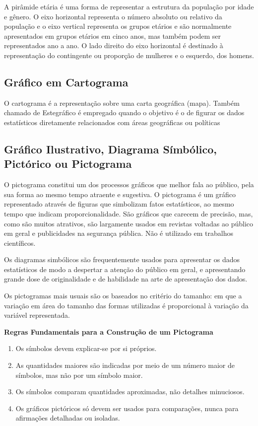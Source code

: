 A pirâmide etária é uma forma de representar a estrutura da
população por idade e gênero. O eixo horizontal representa o
número absoluto ou relativo da população e o eixo vertical
representa os grupos etários e são normalmente apresentados em grupos etários em cinco anos, mas também podem ser representados ano a ano. O lado direito do eixo horizontal é destinado à representação do contingente ou proporção de mulheres e o esquerdo, dos homens.

\subsection{Gráfico em Cartograma}

O cartograma é a representação sobre uma carta geográfica (mapa).
Também chamado de Estegráfico é empregado quando o objetivo é o de
figurar os dados estatísticos diretamente relacionados com áreas
geográficas ou políticas


\newpage
\subsection{Gráfico Ilustrativo, Diagrama Símbólico, Pictórico ou Pictograma}

O pictograma constitui um dos processos gráficos que melhor fala
ao público, pela sua forma ao mesmo tempo atraente e sugestiva. O
pictograma é um gráfico representado através de figuras que
simbolizam fatos estatísticos, ao mesmo tempo que indicam
proporcionalidade. São gráficos que carecem de precisão, mas, como
são muitos atrativos, são largamente usados em revistas voltadas
ao público em geral e publicidades na segurança pública. Não é
utilizado em trabalhos científicos.\vskip0.3cm


Os diagramas simbólicos são frequentemente usados para apresentar os dados estatísticos de modo a despertar a atenção do público em geral, e apresentando grande dose de originalidade e de habilidade na arte de apresentação dos dados.\vskip0.3cm



Os pictogramas mais usuais são os baseados no critério do tamanho: em que a variação em área do tamanho das formas utilizadas é proporcional à variação da variável representada.\vskip0.3cm



\textbf{Regras Fundamentais para a Construção de um Pictograma}

\begin{enumerate}
    \item Os símbolos devem explicar-se por si próprios.
    \item As quantidades maiores são indicadas por meio de um
    número maior de símbolos, mas não por um símbolo maior.
    \item Os símbolos comparam quantidades aproximadas, não
    detalhes minuciosos.
    \item Os gráficos pictóricos só devem ser usados para
    comparações, nunca para afirmações detalhadas ou isoladas.
\end{enumerate}

